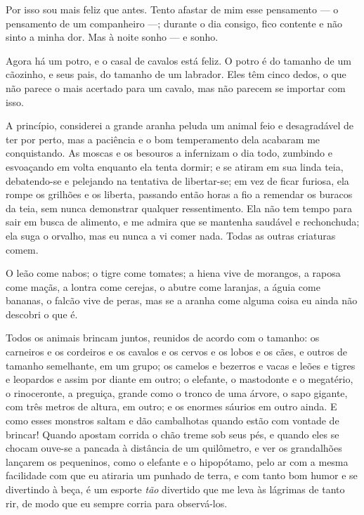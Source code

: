 Por isso sou mais feliz que antes. Tento afastar de mim esse pensamento --- o pensamento
de um companheiro ---; durante o dia consigo, fico contente e não sinto a minha dor. Mas
à noite sonho --- e sonho.

\sectionitem

 Agora há um potro, e o casal de cavalos está feliz. O potro é do tamanho de um cãozinho,
e seus pais, do tamanho de um labrador. Eles têm cinco dedos, o que não parece o mais acertado
para um cavalo, mas não parecem se importar com isso.

A princípio, considerei a grande aranha peluda um animal feio e desagradável de ter por perto,
mas a paciência e o bom temperamento dela acabaram me conquistando. As moscas e os besouros
a infernizam o dia todo, zumbindo e esvoaçando em volta enquanto ela tenta dormir; e se atiram
em sua linda teia, debatendo-se e pelejando na tentativa de libertar-se; em vez de ficar furiosa, ela
rompe os grilhões e os liberta, passando então horas a fio a remendar os buracos da teia, sem
nunca demonstrar qualquer ressentimento. Ela não tem tempo para sair em busca de alimento, e me admira
que se mantenha saudável e rechonchuda; ela suga o orvalho, mas eu nunca a vi comer nada. Todas
as outras criaturas comem.

O leão come nabos; o tigre come tomates; a hiena vive de morangos, a raposa come maçãs, a lontra
come cerejas, o abutre come laranjas, a águia come bananas, o falcão vive de peras,
mas se a aranha come alguma coisa eu ainda não descobri o que é.

Todos os animais brincam juntos, reunidos de acordo com o tamanho: os carneiros e os cordeiros e os cavalos e os cervos
e os lobos e os cães, e outros de tamanho semelhante, em um grupo; os camelos e bezerros e vacas e leões e tigres e leopardos e assim por diante em outro;
o elefante, o mastodonte e o megatério, o rinoceronte, a preguiça, grande como o tronco de uma árvore, o sapo gigante, com três metros de altura,
em outro; e os enormes sáurios em outro ainda. E como esses monstros saltam e dão cambalhotas quando estão com vontade de brincar!
Quando apostam corrida o chão treme sob seus pés, e quando eles se chocam ouve-se a pancada à distância de um quilômetro, e ver
os grandalhões lançarem os pequeninos, como o elefante e o hipopótamo, pelo ar com a mesma facilidade com que eu atiraria um punhado de terra,
e com tanto bom humor e se divertindo à beça, é um esporte \textit{tão} divertido que me leva às lágrimas de tanto rir, de modo que
eu sempre corria para observá-los.

